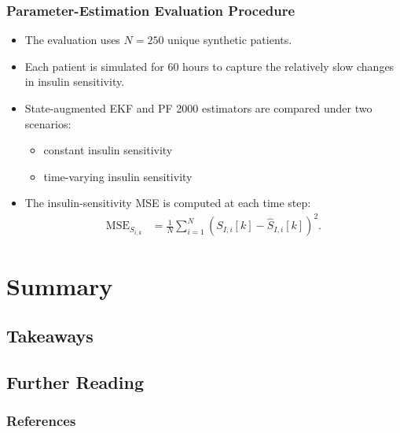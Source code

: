 \documentclass[aspectratio=43]{beamer}
\begin{document}
\begin{frame}
  \frametitle{Parameter-Estimation Evaluation Procedure}

  \begin{itemize}
    \item The evaluation uses $N=250$ unique synthetic patients.

    \item Each patient is simulated for 60 hours to capture the relatively
          slow changes in insulin sensitivity.

    \item State-augmented EKF and PF 2000 estimators are compared under
          two scenarios:
          \begin{itemize}
            \item constant insulin sensitivity
            \item time-varying insulin sensitivity
          \end{itemize}

    \item The insulin-sensitivity MSE is computed at each time step:
      \begin{align*}
        \mathrm{MSE}_{S_{i,k}}
        &=
        \frac{1}{N}
        \sum_{i=1}^{N}
        \left(
          S_{I,i}[k]-\hat{S}_{I,i}[k]
        \right)^2.
      \end{align*}
  \end{itemize}

\end{frame}



\section{Summary}

\subsection{Takeaways}

\subsection{Further Reading}
\begin{frame}
  \frametitle{References}
  \printbibliography
\end{frame}
\end{document}
